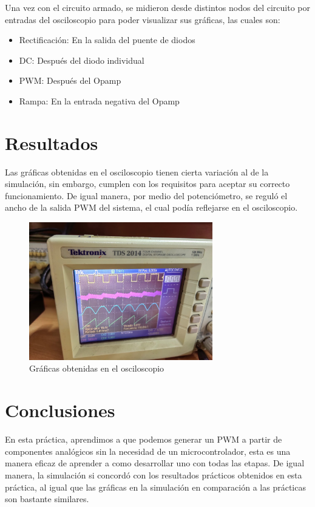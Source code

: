\documentclass[]{article}
\begin{document}
Una vez con el circuito armado, se midieron desde distintos nodos del circuito por entradas del osciloscopio para poder visualizar sus gráficas, las cuales son:

\begin{itemize}
    \item Rectificación: En la salida del puente de diodos
    \item DC: Después del diodo individual
    \item PWM: Después del Opamp
    \item Rampa: En la entrada negativa del Opamp
\end{itemize}

\section{Resultados}

Las gráficas obtenidas en el osciloscopio tienen cierta variación al de la simulación, sin embargo, cumplen con los requisitos para aceptar su correcto funcionamiento. 
De igual manera, por medio del potenciómetro, se reguló el ancho de la salida PWM del sistema, el cual podía reflejarse en el osciloscopio.

\begin{figure}
    \centering
    \includegraphics[width=8cm]{build/Imagenes/Resultados.jpg}
    \caption{Gráficas obtenidas en el osciloscopio}
\end{figure}

\section{Conclusiones}

En esta práctica, aprendimos a que podemos generar un PWM a partir de componentes analógicos sin la necesidad de un microcontrolador, esta es una manera eficaz de 
aprender a como desarrollar uno con todas las etapas. De igual manera, la simulación si concordó con los resultados prácticos obtenidos en esta práctica, al igual que las gráficas 
en la simulación en comparación a las prácticas son bastante similares.


\end{document}
